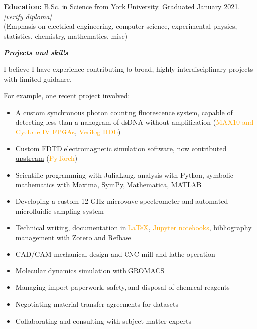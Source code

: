 \documentclass[fleqn,11pt]{article}
\newcommand{\ressection}[1]{\textbf{{\Large \textit{#1}}}\xrfill[0.1ex]{0.6pt}}
\newcommand{\sk}[1]{\textcolor{orange}{#1}}
\newcommand{\itemoptions}{\setlength{\itemindent}{-10pt} \setlength\itemsep{-1em}}
\begin{document}
\begin{tcolorbox}
	\textbf{Education:} B.Sc. in Science from York University. Graduated January 2021. \href{https://learner.mycreds.ca/#/sharelink/b664abe7-53a7-4d64-a0f1-bef16337edd0/57724eeb-34ab-4b79-b2a6-cd6bc311039e}{\textit{[verify diploma]}} \\
	{\small(Emphasis on electrical engineering, computer science, experimental physics, statistics, chemistry, mathematics, misc)}
\end{tcolorbox}
 
\pagebreak

\ressection{Projects and skills}

I believe I have experience contributing to broad, highly interdisciplinary projects with limited guidance.

For example, one recent project involved:
\begin{itemize}\itemoptions
	\item A \href{https://github.com/0xDBFB7/fluorescence_photon_counting/releases/download/v0.01/fluorescence.pdf}{custom synchronous photon counting fluorescence system}, capable of detecting less than a nanogram of dsDNA without amplification (\sk{MAX10 and Cyclone IV FPGAs}, \sk{Verilog HDL})
	\item Custom FDTD electromagnetic simulation software, \href{https://github.com/flaport/fdtd/pull/27}{now contributed upstream} (\sk{PyTorch})
	\item Scientific programming with JuliaLang, analysis with Python, symbolic mathematics with Maxima, SymPy, Mathematica, MATLAB
	\item Developing a custom 12 GHz microwave spectrometer and automated microfluidic sampling system
	\item Technical writing, documentation in \sk{LaTeX}, \sk{Jupyter notebooks}, bibliography management with Zotero and Refbase
	\item CAD/CAM mechanical design and CNC mill and lathe operation
	\item Molecular dynamics simulation with GROMACS
	\item Managing import paperwork, safety, and disposal of chemical reagents
	\item Negotiating material transfer agreements for datasets
	\item Collaborating and consulting with subject-matter experts
\end{itemize}
\end{document}
